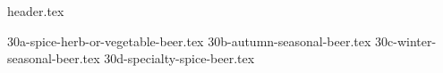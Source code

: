 \clearpage
{}
\divisorLine
{header.tex}
\begin{multicols*}{2}
{30a-spice-herb-or-vegetable-beer.tex}
{30b-autumn-seasonal-beer.tex}
{30c-winter-seasonal-beer.tex}
{30d-specialty-spice-beer.tex}
\end{multicols*}